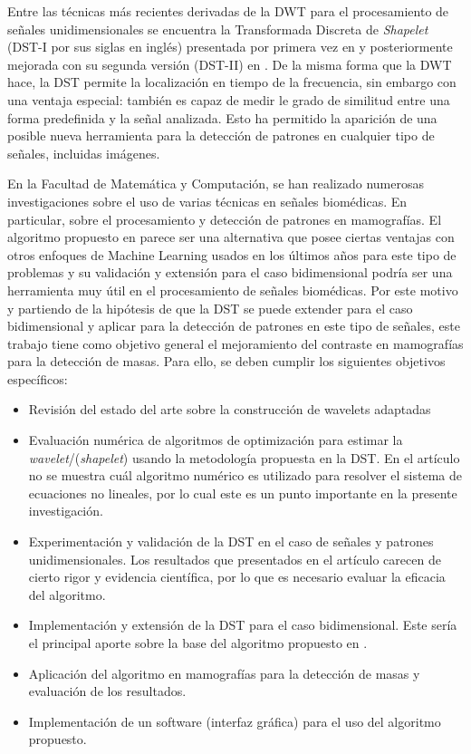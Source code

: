 Entre las técnicas más recientes derivadas de la DWT para el procesamiento de
señales unidimensionales se encuentra 
la Transformada Discreta de \textit{Shapelet} 
(DST-I por sus siglas en inglés) presentada por primera vez en \cite{Guido2008} y
posteriormente mejorada con su segunda versión (DST-II) en \cite{Guido2018}.
De la misma forma que la DWT hace, la DST permite la localización 
en tiempo de la frecuencia, sin embargo con una ventaja especial:
también es capaz de medir le grado de similitud entre una forma predefinida
y la señal analizada. Esto ha permitido la aparición de una posible nueva herramienta para 
la detección de patrones en cualquier tipo de señales, incluidas imágenes.

En la Facultad de Matemática y Computación, se han realizado numerosas
investigaciones sobre el uso de 
varias técnicas en señales biomédicas. En particular, sobre el procesamiento
y detección de patrones en mamografías. El algoritmo propuesto en \cite{Guido2018} parece ser 
una alternativa que posee ciertas ventajas con otros enfoques de Machine Learning 
usados en los últimos años para este tipo de problemas y su validación y extensión para
el caso bidimensional podría ser una herramienta muy útil en el procesamiento de señales
biomédicas. Por este motivo y partiendo de la hipótesis de que la DST se 
puede extender para el caso bidimensional y aplicar 
para la detección de patrones en este tipo de
señales, este trabajo tiene como objetivo general el mejoramiento del contraste
en mamografías para la detección de masas. Para ello, se deben cumplir los 
siguientes objetivos específicos:

\begin{itemize}
	\item Revisión del estado del arte sobre la construcción de wavelets adaptadas 
	\item Evaluación numérica de algoritmos de optimización para estimar la \textit{wavelet}/(\textit{shapelet})
		usando la metodología propuesta en la DST. En el artículo \cite{Guido2018} no se muestra
		cuál algoritmo numérico es utilizado para resolver el sistema de ecuaciones no lineales, 
		por lo cual este es un punto importante en la presente investigación.
	\item Experimentación y validación de la DST en el caso de señales y patrones unidimensionales. Los resultados
	que presentados en el artículo \cite{Guido2018} carecen de cierto rigor y evidencia científica, por lo 
	que es necesario evaluar la eficacia del algoritmo.
	\item Implementación y extensión de la DST para el caso bidimensional. Este sería el principal aporte sobre
		la base del algoritmo propuesto en \cite{Guido2018}.
	\item Aplicación del algoritmo en mamografías para la detección de masas y evaluación de los resultados.  
	\item Implementación de un software (interfaz gráfica) para el uso del algoritmo propuesto.
\end{itemize}
